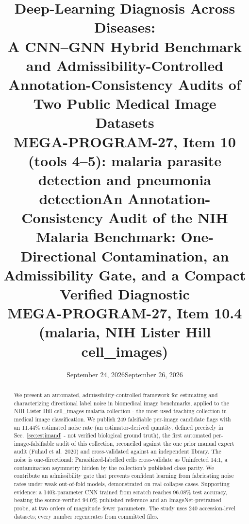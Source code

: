 \documentclass[11pt]{article}
\title{\textbf{Deep-Learning Diagnosis Across Diseases:\\
A CNN--GNN Hybrid Benchmark and Admissibility-Controlled\\Annotation-Consistency Audits of Two Public Medical Image Datasets}\\[6pt]
\large MEGA-PROGRAM-27, Item 10 (tools 4--5): malaria parasite detection and pneumonia detection}
\author{}
\date{September 24, 2026}
\title{\textbf{An Annotation-Consistency Audit of the NIH Malaria Benchmark: One-Directional Contamination, an Admissibility Gate, and a Compact Verified Diagnostic}\\
\large MEGA-PROGRAM-27, Item 10.4 (malaria, NIH Lister Hill cell\_images)}
\author{}
\date{September 26, 2026}
\theoremstyle{definition}
\begin{document}
\maketitle
\begin{abstract}
We present an automated, admissibility-controlled framework for estimating and characterizing directional label noise in biomedical image benchmarks, applied to the NIH Lister Hill cell\_images malaria collection - the most-used teaching collection in medical image classification. We publish 249 falsifiable per-image candidate flags with an 11.44\% estimated noise rate (an estimator-derived quantity, defined precisely in Sec.~\ref{sec:estimand} - not verified biological ground truth), the first automated per-image-falsifiable audit of this collection, reconciled against the one prior manual expert audit (Fuhad et al.\ 2020) and cross-validated against an independent library. The noise is one-directional: Parasitized-labelled cells cross-validate as Uninfected 14:1, a contamination asymmetry hidden by the collection's published class parity. We contribute an admissibility gate that prevents confident learning from fabricating noise rates under weak out-of-fold models, demonstrated on real collapse cases. Supporting evidence: a 140k-parameter CNN trained from scratch reaches 96.08\% test accuracy, beating the source-verified 94.0\% published reference and an ImageNet-pretrained probe, at two orders of magnitude fewer parameters. The study uses 240 accession-level datasets; every number regenerates from committed files.
\end{abstract}
\tableofcontents
\newpage





























\end{document}
